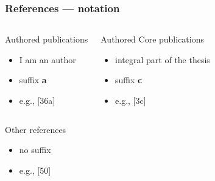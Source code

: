 \documentclass[aspectratio=169]{beamer}
\begin{document}
\begin{frame}
\frametitle{References --- notation}

\begin{columns}[c]


\begin{block}{Authored publications}
  \begin{itemize}
    \item I am an author
    \item suffix \textbf{a}
    \item e.g., [36a]
  \end{itemize}
\end{block}


\begin{block}{Authored Core publications}
  \begin{itemize}
    \item integral part of the thesis
    \item suffix \textbf{c}
    \item e.g., [3c]
  \end{itemize}
\end{block}

\end{columns}

\begin{columns}[c]



\begin{block}{Other references}
  \begin{itemize}
    \item no suffix
    \item e.g., [50]
  \end{itemize}
\end{block}


\end{columns}

\end{frame}


\end{document}

